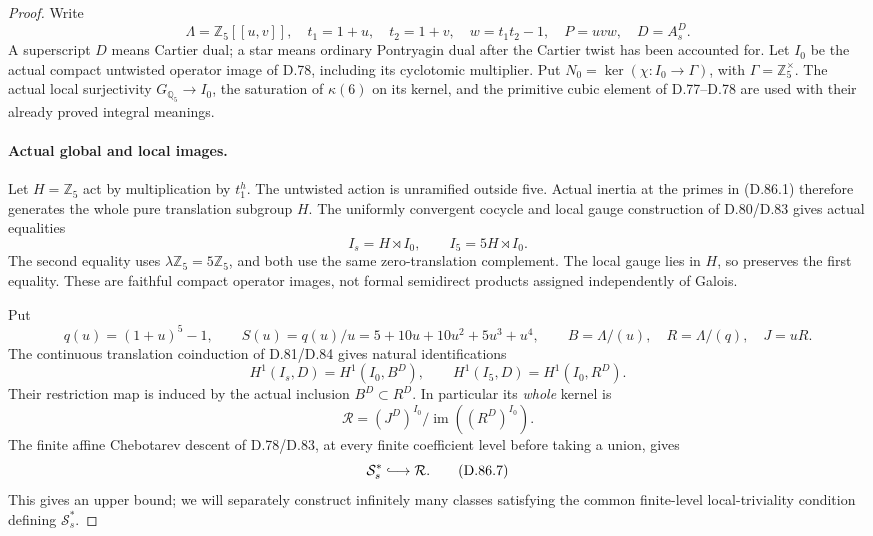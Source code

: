 \begin{proof}
Write
\[
 \Lambda=\mathbb Z_5[[u,v]],\quad t_1=1+u,\quad t_2=1+v,
 \quad w=t_1t_2-1,\quad P=uvw,\quad D=A_s^D.
\]
A superscript \(D\) means Cartier dual; a star means ordinary
Pontryagin dual after the Cartier twist has been accounted for.
Let \(I_0\) be the actual compact untwisted operator image of
D.78, including its cyclotomic multiplier. Put
\(N_0=\ker(\chi:I_0\to\Gamma)\), with
\(\Gamma=\mathbb Z_5^\times\). The actual local surjectivity
\(G_{\mathbb Q_5}\to I_0\), the saturation of \(\kappa(6)\)
on its kernel, and the primitive cubic element of D.77--D.78
are used with their already proved integral meanings.

\paragraph{Actual global and local images.}
Let \(H=\mathbb Z_5\) act by multiplication by \(t_1^h\).
The untwisted action is unramified outside five. Actual inertia
at the primes in (D.86.1) therefore generates the whole pure
translation subgroup \(H\). The uniformly convergent cocycle
and local gauge construction of D.80/D.83 gives actual equalities
\[
              I_s=H\rtimes I_0,
       \qquad I_5=5H\rtimes I_0.                       \tag{D.86.3}
\]
The second equality uses \(\lambda\mathbb Z_5=5\mathbb Z_5\),
and both use the same zero-translation complement. The local
gauge lies in \(H\), so preserves the first equality. These
are faithful compact operator images, not formal semidirect
products assigned independently of Galois.

Put
\[
 q(u)=(1+u)^5-1,
 \qquad S(u)=q(u)/u=5+10u+10u^2+5u^3+u^4,
 \qquad B=\Lambda/(u),\quad R=\Lambda/(q),\quad J=uR.
                                                               \tag{D.86.4}
\]
The continuous translation coinduction of D.81/D.84 gives
natural identifications
\[
 H^1(I_s,D)=H^1(I_0,B^D),\qquad
 H^1(I_5,D)=H^1(I_0,R^D).                               \tag{D.86.5}
\]
Their restriction map is induced by the actual inclusion
\(B^D\subset R^D\). In particular its \emph{whole} kernel is
\[
 \mathcal R=(J^D)^{I_0}/\operatorname{im}((R^D)^{I_0}). \tag{D.86.6}
\]
The finite affine Chebotarev descent of D.78/D.83, at every
finite coefficient level before taking a union, gives
\[
                         \mathcal S_s^*\lhook\joinrel\longrightarrow
                         \mathcal R.                  \tag{D.86.7}
\]
This gives an upper bound; we will separately construct
infinitely many classes satisfying the common finite-level
local-triviality condition defining \(\mathcal S_s^*\).


\end{proof}
